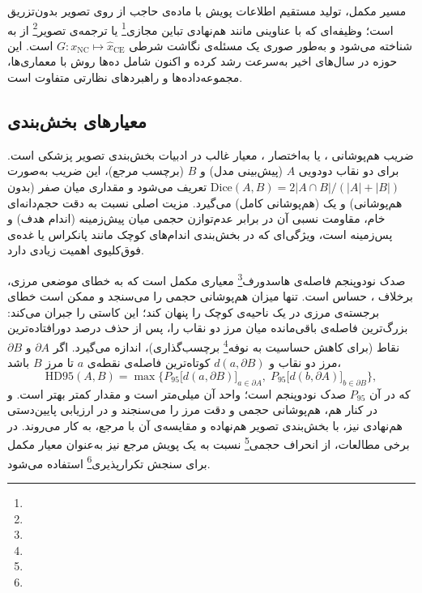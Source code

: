 مسیر مکمل، تولید مستقیم اطلاعات پویش با ماده‌ی حاجب از روی تصویر بدون‌تزریق است؛ وظیفه‌ای که با عناوینی مانند هم‌نهادی تباین مجازی\footnote{} یا ترجمه‌ی تصویر\footnote{} از  به  شناخته می‌شود و به‌طور صوری یک مسئله‌ی نگاشت شرطی $G: x_{\mathrm{NC}} \mapsto \hat{x}_{\mathrm{CE}}$ است. این حوزه در سال‌های اخیر به‌سرعت رشد کرده و اکنون شامل ده‌ها روش با معماری‌ها، مجموعه‌داده‌ها و راهبردهای نظارتی متفاوت است.

\subsection*{معیارهای بخش‌بندی}


ضریب هم‌پوشانی ، یا به‌اختصار ، معیار غالب در ادبیات بخش‌بندی تصویر پزشکی است. برای دو نقاب دودویی $A$ (پیش‌بینی مدل) و $B$ (برچسب مرجع)، این ضریب به‌صورت $\mathrm{Dice} (A,B) = 2|A\cap B| / (|A|+|B|)$ تعریف می‌شود و مقداری میان صفر (بدون هم‌پوشانی) و یک (هم‌پوشانی کامل) می‌گیرد. مزیت اصلی  نسبت به دقت حجم‌دانه‌ای خام، مقاومت نسبی آن در برابر عدم‌توازن حجمی میان پیش‌زمینه (اندام هدف) و پس‌زمینه است، ویژگی‌ای که در بخش‌بندی اندام‌های کوچک مانند پانکراس یا غده‌ی فوق‌کلیوی اهمیت زیادی دارد.

صدک نودوپنجم فاصله‌ی هاسدورف\footnote{} معیاری مکمل است که به خطای موضعی مرزی، برخلاف ، حساس است.  تنها میزان هم‌پوشانی حجمی را می‌سنجد و ممکن است خطای برجسته‌ی مرزی در یک ناحیه‌ی کوچک را پنهان کند؛  این کاستی را جبران می‌کند: بزرگ‌ترین فاصله‌ی باقی‌مانده میان مرز دو نقاب را، پس از حذف  درصد دورافتاده‌ترین نقاط (برای کاهش حساسیت به نوفه\footnote{} برچسب‌گذاری)، اندازه می‌گیرد. اگر $\partial A$ و $\partial B$ مرز دو نقاب و $d(a,\partial B)$ کوتاه‌ترین فاصله‌ی نقطه‌ی $a$ تا مرز $B$ باشد،
\begin{equation}
\mathrm{HD95}(A,B)=\max\Big\{P_{95}\big[d(a,\partial B)\big]_{a\in\partial A},\;P_{95}\big[d(b,\partial A)\big]_{b\in\partial B}\Big\},
\end{equation}
که در آن $P_{95}$ صدک نودوپنجم است؛ واحد آن میلی‌متر است و مقدار کمتر بهتر است.  و  در کنار هم، هم‌پوشانی حجمی و دقت مرز را می‌سنجند و در ارزیابی پایین‌دستی هم‌نهادی نیز، با بخش‌بندی تصویر هم‌نهاده و مقایسه‌ی آن با مرجع، به کار می‌روند. در برخی مطالعات، از انحراف حجمی\footnote{} نسبت به یک پویش مرجع نیز به‌عنوان معیار مکمل برای سنجش تکرارپذیری\footnote{} استفاده می‌شود.

